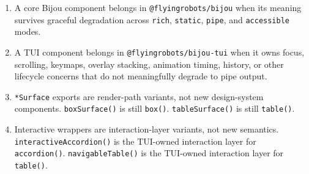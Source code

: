 \begin{enumerate}
\def\labelenumi{\arabic{enumi}.}
\tightlist
\item
  A core Bijou component belongs in \texttt{@\allowbreak{}f\allowbreak{}l\allowbreak{}y\allowbreak{}i\allowbreak{}n\allowbreak{}g\allowbreak{}r\allowbreak{}o\allowbreak{}b\allowbreak{}o\allowbreak{}t\allowbreak{}s\allowbreak{}/\allowbreak{}b\allowbreak{}i\allowbreak{}j\allowbreak{}o\allowbreak{}u} when its meaning survives graceful degradation across \texttt{r\allowbreak{}i\allowbreak{}c\allowbreak{}h}, \texttt{s\allowbreak{}t\allowbreak{}a\allowbreak{}t\allowbreak{}i\allowbreak{}c}, \texttt{p\allowbreak{}i\allowbreak{}p\allowbreak{}e}, and \texttt{a\allowbreak{}c\allowbreak{}c\allowbreak{}e\allowbreak{}s\allowbreak{}s\allowbreak{}i\allowbreak{}b\allowbreak{}l\allowbreak{}e} modes.
\item
  A TUI component belongs in \texttt{@\allowbreak{}f\allowbreak{}l\allowbreak{}y\allowbreak{}i\allowbreak{}n\allowbreak{}g\allowbreak{}r\allowbreak{}o\allowbreak{}b\allowbreak{}o\allowbreak{}t\allowbreak{}s\allowbreak{}/\allowbreak{}b\allowbreak{}i\allowbreak{}j\allowbreak{}o\allowbreak{}u\allowbreak{}-\allowbreak{}t\allowbreak{}u\allowbreak{}i} when it owns focus, scrolling, keymaps, overlay stacking, animation timing, history, or other lifecycle concerns that do not meaningfully degrade to pipe output.
\item
  \texttt{*\allowbreak{}S\allowbreak{}u\allowbreak{}r\allowbreak{}f\allowbreak{}a\allowbreak{}c\allowbreak{}e} exports are render-path variants, not new design-system components. \texttt{b\allowbreak{}o\allowbreak{}x\allowbreak{}S\allowbreak{}u\allowbreak{}r\allowbreak{}f\allowbreak{}a\allowbreak{}c\allowbreak{}e\allowbreak{}(\allowbreak{})} is still \texttt{b\allowbreak{}o\allowbreak{}x\allowbreak{}(\allowbreak{})}. \texttt{t\allowbreak{}a\allowbreak{}b\allowbreak{}l\allowbreak{}e\allowbreak{}S\allowbreak{}u\allowbreak{}r\allowbreak{}f\allowbreak{}a\allowbreak{}c\allowbreak{}e\allowbreak{}(\allowbreak{})} is still \texttt{t\allowbreak{}a\allowbreak{}b\allowbreak{}l\allowbreak{}e\allowbreak{}(\allowbreak{})}.
\item
  Interactive wrappers are interaction-layer variants, not new semantics. \texttt{i\allowbreak{}n\allowbreak{}t\allowbreak{}e\allowbreak{}r\allowbreak{}a\allowbreak{}c\allowbreak{}t\allowbreak{}i\allowbreak{}v\allowbreak{}e\allowbreak{}A\allowbreak{}c\allowbreak{}c\allowbreak{}o\allowbreak{}r\allowbreak{}d\allowbreak{}i\allowbreak{}o\allowbreak{}n\allowbreak{}(\allowbreak{})} is the TUI-owned interaction layer for \texttt{a\allowbreak{}c\allowbreak{}c\allowbreak{}o\allowbreak{}r\allowbreak{}d\allowbreak{}i\allowbreak{}o\allowbreak{}n\allowbreak{}(\allowbreak{})}. \texttt{n\allowbreak{}a\allowbreak{}v\allowbreak{}i\allowbreak{}g\allowbreak{}a\allowbreak{}b\allowbreak{}l\allowbreak{}e\allowbreak{}T\allowbreak{}a\allowbreak{}b\allowbreak{}l\allowbreak{}e\allowbreak{}(\allowbreak{})} is the TUI-owned interaction layer for \texttt{t\allowbreak{}a\allowbreak{}b\allowbreak{}l\allowbreak{}e\allowbreak{}(\allowbreak{})}.

\end{enumerate}
